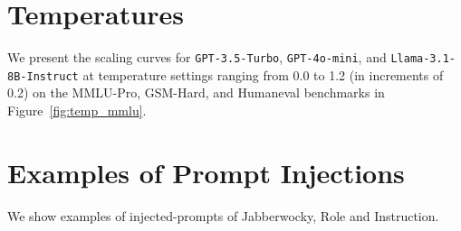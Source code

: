 
\section{Temperatures}
We present the scaling curves for \texttt{GPT-3.5-Turbo}, \texttt{GPT-4o-mini}, and \texttt{Llama-3.1-8B-Instruct} at temperature settings ranging from 0.0 to 1.2 (in increments of 0.2) on the MMLU-Pro, GSM-Hard, and Humaneval benchmarks in Figure~\ref{fig:temp_mmlu}.

\section{Examples of Prompt Injections}
We show examples of injected-prompts of Jabberwocky, Role and Instruction. 
